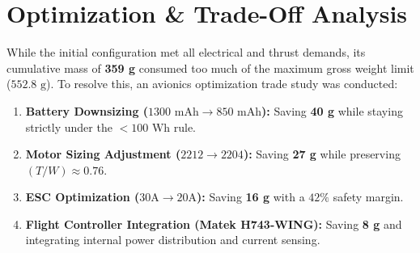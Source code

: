 \documentclass[12pt,a4paper]{article}
\begin{document}
\section{Optimization \& Trade-Off Analysis}
While the initial configuration met all electrical and thrust demands, its cumulative mass of \textbf{359 g} consumed too much of the maximum gross weight limit ($552.8\text{ g}$). To resolve this, an avionics optimization trade study was conducted:
\begin{enumerate}
    \item \textbf{Battery Downsizing ($1300\text{ mAh} \rightarrow 850\text{ mAh}$):} Saving \textbf{40 g} while staying strictly under the $<100\text{ Wh}$ rule.
    \item \textbf{Motor Sizing Adjustment ($2212 \rightarrow 2204$):} Saving \textbf{27 g} while preserving $(T/W) \approx 0.76$.
    \item \textbf{ESC Optimization ($30\text{A} \rightarrow 20\text{A}$):} Saving \textbf{16 g} with a $42\%$ safety margin.
    \item \textbf{Flight Controller Integration (Matek H743-WING):} Saving \textbf{8 g} and integrating internal power distribution and current sensing.
\end{enumerate}
\end{document}
